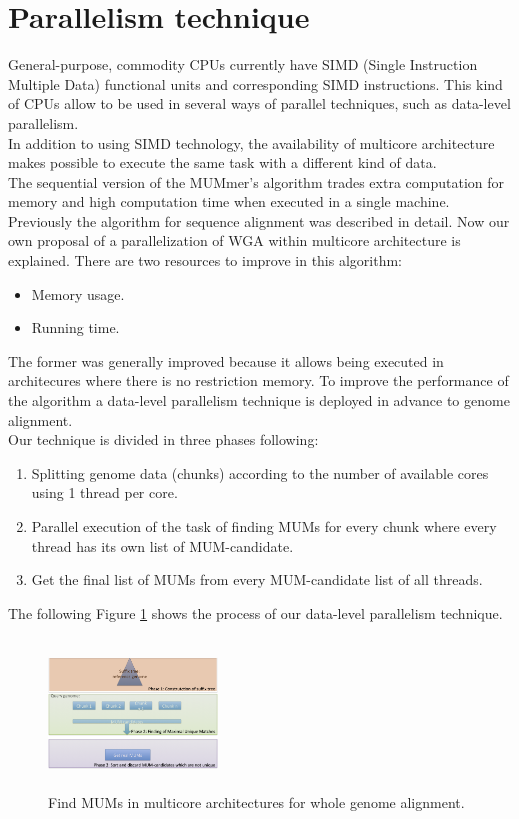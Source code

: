 \documentclass[3p,times]{elsarticle}
\begin{document}
\section{Parallelism technique}  
General-purpose, commodity CPUs currently have SIMD (Single Instruction Multiple Data) functional units and corresponding SIMD instructions. This kind of CPUs allow to be used in several ways of parallel techniques, such as data-level parallelism. \\
In addition to using SIMD technology, the availability of multicore architecture makes possible to execute the same task with a different kind of data.\\
The sequential version of the MUMmer's algorithm trades extra computation for memory and high computation time when executed in a single machine. \\
Previously the algorithm for sequence alignment was described in detail. Now our own proposal of a parallelization of WGA within multicore architecture is explained. There are two resources to improve in this algorithm:
\begin{itemize}
\item Memory usage.
\item Running time.
\end{itemize}
The former was generally improved because it allows being executed in architecures where there is no restriction memory. To improve the performance of the algorithm a data-level parallelism technique is deployed in advance to genome alignment.\\
Our technique is divided in three phases following:
\begin{enumerate}
\item Splitting genome data (chunks) according to the number of available cores using 1 thread per core.
\item Parallel execution of the task of finding MUMs for every chunk where every thread has its own list of MUM-candidate.
\item Get the final list of MUMs from every MUM-candidate list of all threads.
\end{enumerate}
The following Figure \ref{algorithm} shows the process of our data-level parallelism technique.
\begin{figure}[htb]  
\begin{center} 
  \includegraphics[width=4.5cm,height=4cm]{Phases.png}
\end{center} 
\caption{Find MUMs in multicore architectures for whole genome alignment.} 
\label{algorithm} 
\end{figure} 
\end{document}
